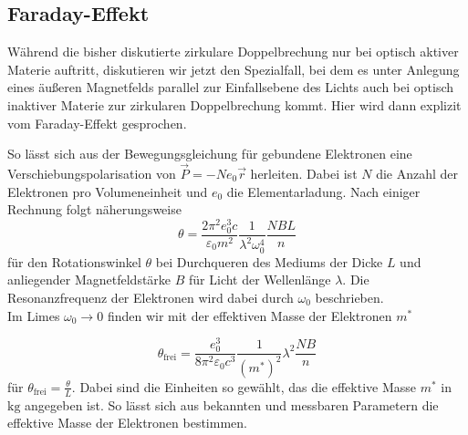 \subsection{Faraday-Effekt}

Während die bisher diskutierte zirkulare Doppelbrechung nur bei optisch aktiver Materie auftritt, diskutieren wir jetzt den Spezialfall, 
bei dem es unter Anlegung eines äußeren Magnetfelds parallel zur Einfallsebene des Lichts auch bei optisch inaktiver Materie zur zirkularen Doppelbrechung kommt.
Hier wird dann explizit vom Faraday-Effekt gesprochen.

So lässt sich aus der Bewegungsgleichung für gebundene Elektronen eine Verschiebungspolarisation von $\vec{P} = - N e_0 \vec{r}$ herleiten.
Dabei ist $N$ die Anzahl der Elektronen pro Volumeneinheit und $e_0$ die Elementarladung.
Nach einiger Rechnung folgt näherungsweise
\begin{equation*}
    \theta = \frac{2 \pi^2 e^3_0 c}{\varepsilon_0 m^2} \frac{1}{ \lambda^2 \omega_0^4} \frac{N B L}{n}
\end{equation*}
für den Rotationswinkel $\theta$ bei Durchqueren des Mediums der Dicke $L$ und anliegender Magnetfeldstärke $B$ für Licht der Wellenlänge $\lambda$.
Die Resonanzfrequenz der Elektronen wird dabei durch $\omega_0$ beschrieben. \\

Im Limes $\omega_0 \rightarrow 0$ finden wir mit der effektiven Masse der Elektronen $m^*$

\begin{equation}
    \theta_\text{frei} = \frac{e^3_0}{8 \pi^2 \varepsilon_0 c^3} \frac{1}{(m^*)^2} \lambda^2 \frac{N B}{n}
    \label{eq:theta_frei}
\end{equation}
für $\theta_\text{frei} = \frac{\theta}{L}$.
Dabei sind die Einheiten so gewählt, das die effektive Masse $m^*$ in $\si{\kilo\gram}$ angegeben ist.
So lässt sich aus bekannten und messbaren Parametern die effektive Masse der Elektronen bestimmen.



